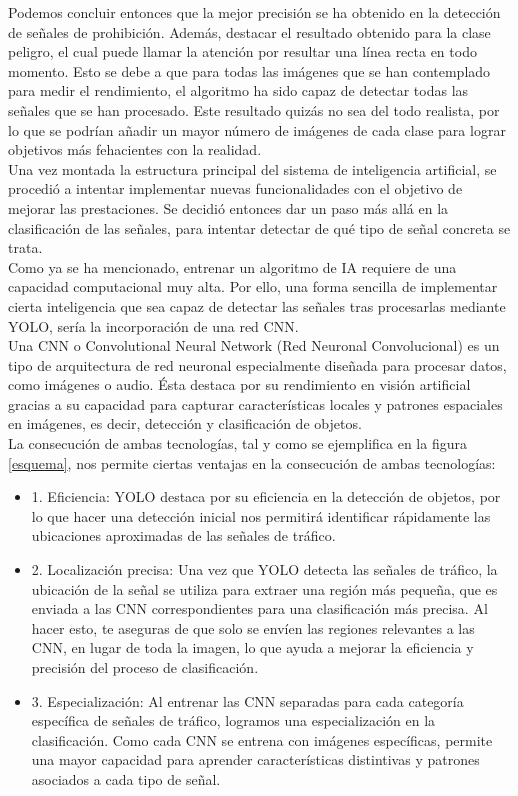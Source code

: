 Podemos concluir entonces que la mejor precisión se ha obtenido en la detección de señales de prohibición. Además, destacar el resultado obtenido para la clase peligro, el cual puede llamar la atención por resultar una línea recta en todo momento. Esto se debe a que para todas las imágenes que se han contemplado para medir el rendimiento, el algoritmo ha sido capaz de detectar todas las señales que se han procesado. Este resultado quizás no sea del todo realista, por lo que se podrían añadir un mayor número de imágenes de cada clase para lograr objetivos más fehacientes con la realidad.\\

Una vez montada la estructura principal del sistema de inteligencia artificial, se procedió a intentar implementar nuevas funcionalidades con el objetivo de mejorar las prestaciones. Se decidió entonces dar un paso más allá en la clasificación de las señales, para intentar detectar de qué tipo de señal concreta se trata.\\

Como ya se ha mencionado, entrenar un algoritmo de IA requiere de una capacidad computacional muy alta. Por ello, una forma sencilla de implementar cierta inteligencia que sea capaz de detectar las señales tras procesarlas mediante YOLO, sería la incorporación de una red CNN.\\

Una CNN o Convolutional Neural Network (Red Neuronal Convolucional) es un tipo de arquitectura de red neuronal especialmente diseñada para procesar datos, como imágenes o audio. Ésta destaca por su rendimiento en visión artificial gracias a su capacidad para capturar características locales y patrones espaciales en imágenes, es decir, detección y clasificación de objetos.\\

La consecución de ambas tecnologías, tal y como se ejemplifica en la figura \ref{esquema}, nos permite ciertas ventajas en la consecución de ambas tecnologías:\\

\begin{itemize}
\item 1.	Eficiencia: YOLO destaca por su eficiencia en la detección de objetos, por lo que hacer una detección inicial nos permitirá identificar rápidamente las ubicaciones aproximadas de las señales de tráfico.
\item 2.	Localización precisa: Una vez que YOLO detecta las señales de tráfico, la ubicación de la señal se utiliza para extraer una región más pequeña, que es enviada a las CNN correspondientes para una clasificación más precisa. Al hacer esto, te aseguras de que solo se envíen las regiones relevantes a las CNN, en lugar de toda la imagen, lo que ayuda a mejorar la eficiencia y precisión del proceso de clasificación.
\item 3.	Especialización: Al entrenar las CNN separadas para cada categoría específica de señales de tráfico, logramos una especialización en la clasificación. Como cada CNN se entrena con imágenes específicas, permite una mayor capacidad para aprender características distintivas y patrones asociados a cada tipo de señal.
\end{itemize}

